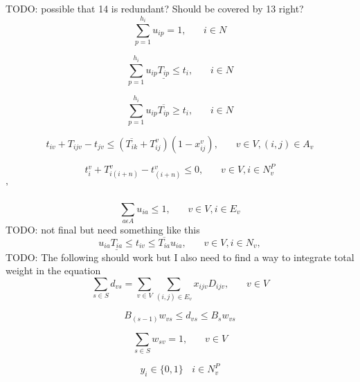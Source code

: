 \documentclass[a4paper,12pt]{article}
\begin{document}
TODO: possible that 14 is redundant? Should be covered by 13 right? 
\begin{equation} \label{eq:15}
    \sum_{p = 1}^{h_i} u_{ip} = 1, ~~~~~~~~ i\in N
\end{equation}

\begin{equation} \label{eq:15}
    \sum_{p = 1}^{h_i} u_{ip}\underline{T_{ip}} \leq t_{i}, ~~~~~~~~ i\in N
\end{equation}

\begin{equation} \label{eq:15}
    \sum_{p = 1}^{h_i} u_{ip}\overline{T_{ip}} \geq t_{i}, ~~~~~~~~ i\in N
\end{equation}

\begin{equation} \label{eq:15}
    t_{iv} + T_{ijv} - t_{jv} \leq (\overline{T_{ik}} + T_{ij}^v)(1 - x_{ij}^v), ~~~~~~~~ v \in V, (i,j) \in A_v
\end{equation}

\begin{equation} \label{eq:16}
    t_{i}^v + T_{i(i+n)}^v - t_{(i+n)}^v \leq 0, ~~~~~~~~ v \in V, i \in N^P_v
\end{equation}'

\begin{equation} \label{eq:17}
    \sum_{a\epsilon A} u_{ia} \leq 1, ~~~~~~~~ v \in V, i\in E_v
\end{equation}
TODO: not final but need something like this
\begin{equation} \label{eq:17}
    u_{ia}\underline{T_{ia}} \leq t_{iv} \leq  \overline{T_{ia}}u_{ia}, ~~~~~~~~ v \in V, i \in N_v,
\end{equation}
TODO: The following should work but I also need to find a way to integrate total weight in the equation
\begin{equation} \label{eq:18}
    \sum_{s \in S}d_{vs} = \sum_{v \in V} \sum_{(i,j) \in E_v} x_{ijv}D_{ijv},~~~~~~~~ v \in V
\end{equation}

\begin{equation} \label{eq:19}
    B_{(s-1)}w_{vs} \leq d_{vs} \leq B_sw_{vs}
\end{equation}

\begin{equation} \label{eq:20}
 \sum_{s \in S} w_{sv} = 1 ,~~~~~~~~ v \in V
\end{equation}

\begin{equation} \label{eq:21}
y_i \in \{0, 1\} ~~~~ i \in N_v^P
\end{equation}
\end{document}
